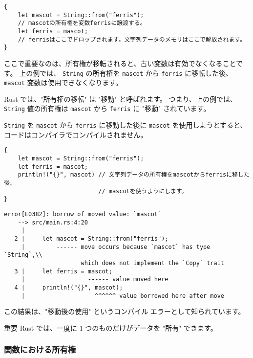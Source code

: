 \begin{lstlisting}[numbers=none]
{
    let mascot = String::from("ferris");
    // mascotの所有権を変数ferrisに譲渡する。
    let ferris = mascot;
    // ferrisはここでドロップされます。文字列データのメモリはここで解放されます。
}
\end{lstlisting}

ここで重要なのは、所有権が移転されると、古い変数は有効でなくなることです。 上の例では、 \texttt{String} の所有権を \texttt{mascot} から \texttt{ferris} に移転した後、 \texttt{mascot} 変数は使用できなくなります。

Rust では、"所有権の移転" は "移動" と呼ばれます。 つまり、上の例では、 \texttt{String} 値の所有権は \texttt{mascot} から \texttt{ferris} に "移動" されています。

\texttt{String} を \texttt{mascot} から \texttt{ferris} に移動した後に \texttt{mascot} を使用しようとすると、コードはコンパイラでコンパイルされません。

\begin{lstlisting}[numbers=none]
{
    let mascot = String::from("ferris");
    let ferris = mascot;
    println!("{}", mascot) // 文字列データの所有権をmascotからferrisに移した後、
                           // mascotを使うようにします。
}
\end{lstlisting}


\begin{lstlisting}[numbers=none]
    error[E0382]: borrow of moved value: `mascot`
    --> src/main.rs:4:20
     |
   2 |     let mascot = String::from("ferris");
     |         ------ move occurs because `mascot` has type `String`,\\
                      which does not implement the `Copy` trait
   3 |     let ferris = mascot;
     |                  ------ value moved here
   4 |     println!("{}", mascot);
     |                    ^^^^^^ value borrowed here after move
\end{lstlisting}

この結果は、"移動後の使用" というコンパイル エラーとして知られています。

\begin{itembox}[l]{重要}
Rust では、一度に 1 つのものだけがデータを "所有" できます。
\end{itembox}

\subsubsection{関数における所有権}

